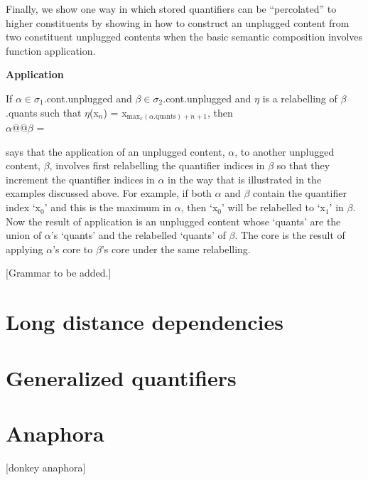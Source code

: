 Finally, we show one way in which stored quantifiers can be
``percolated'' to higher constituents by showing in \nexteg{} how to
construct an unplugged content from two constituent unplugged contents
when the basic semantic composition involves function application.
\begin{ex} 
\textbf{Application}

If $\alpha\in\sigma_1$.cont.unplugged and
$\beta\in\sigma_2$.cont.unplugged and $\eta$ is a relabelling of
$\beta$.quants such that $\eta$(x$_n$) =
x$_{\mathrm{max}_x(\alpha.\mathrm{quants})+n+1}$, then \\
\hspace*{2em} $\alpha @@\beta$ = 
\end{ex} 
\preveg{} says that the application of an unplugged content, $\alpha$,
to another unplugged content, $\beta$, involves first relabelling the
quantifier indices in $\beta$ so that they increment the quantifier
indices in $\alpha$ in the way that is illustrated in the examples
discussed above.  For example, if both $\alpha$ and $\beta$ contain
the quantifier index `x$_0$' and this is the maximum in $\alpha$, then
`x$_0$' will be relabelled to `x$_1$' in $\beta$.  Now the result of
application is an unplugged content whose `quants' are the union of
$\alpha$'s `quants' and the relabelled `quants' of $\beta$.  The core
is the result of applying $\alpha$'s core to $\beta$'s core under the
same relabelling. 
  

[Grammar to be added.]

\section{Long distance dependencies}

 



\section{Generalized quantifiers}



\section{Anaphora}

[donkey anaphora]

